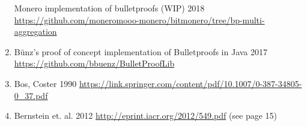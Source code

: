 \documentclass[10pt,a4paper]{article}
\begin{document}
\begin{enumerate}
  \protect\hypertarget{anchor-72}{}{}Monero implementation of
  bulletproofs (WIP) 2018
  \url{https://github.com/moneromooo-monero/bitmonero/tree/bp-multi-aggregation}
\item
  \protect\hypertarget{anchor-73}{}{}Bünz's proof of concept
  implementation of Bulletproofs in Java 2017
  \url{https://github.com/bbuenz/BulletProofLib}
\item
  \protect\hypertarget{anchor-75}{}{}Bos, Coster 1990
  \url{https://link.springer.com/content/pdf/10.1007/0-387-34805-0_37.pdf}
\item
  \protect\hypertarget{anchor-76}{}{}Bernstein et. al. 2012
  \url{http://eprint.iacr.org/2012/549.pdf} (see page 15)
\end{enumerate}
\end{document}
